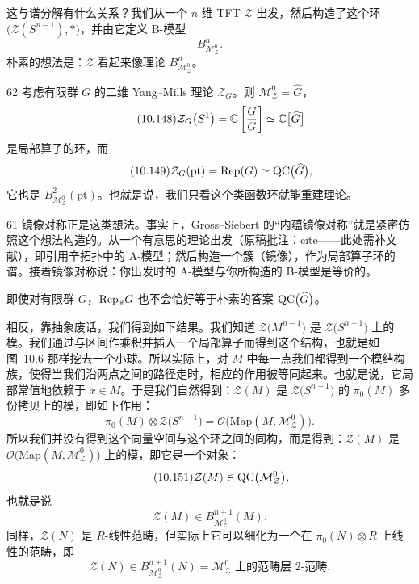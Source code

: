 这与谱分解有什么关系？我们从一个 $n$ 维 TFT $\mathcal{Z}$ 出发，然后构造了这个环 $\big(\mathcal{Z}(S^{n-1}),*\big)$，并由它定义 B-模型
\begin{equation}\tag{10.147}
B_{\mathcal{M}_{\mathcal{Z}}^{0}}^{n}.
\end{equation}
朴素的想法是：$\mathcal{Z}$ 看起来像理论 $B_{\mathcal{M}_{\mathcal{Z}}^{0}}^{n}$。

\begin{srcex}{62}
考虑有限群 $G$ 的二维 Yang--Mills 理论 $\mathcal{Z}_G$。则 $\mathcal{M}_{\mathcal{Z}}^{0}=\widehat{G}$，
\begin{equation}\tag{10.148}
\mathcal{Z}_G\big(S^1\big)=\mathbb{C}\left[\frac{G}{G}\right]\simeq\mathbb{C}\big[\widehat{G}\big]
\end{equation}
是局部算子的环，而
\begin{equation}\tag{10.149}
\mathcal{Z}_G(\mathrm{pt})=\mathrm{Rep}(G)\simeq\mathrm{QC}\big(\widehat{G}\big),
\end{equation}
它也是 $B_{\mathcal{M}_{\mathcal{Z}}^{0}}^{2}(\mathrm{pt})$。也就是说，我们只看这个类函数环就能重建理论。
\end{srcex}

\begin{srcrem}{61}
镜像对称正是这类想法。事实上，Gross--Siebert 的“内蕴镜像对称”就是紧密仿照这个想法构造的。从一个有意思的理论出发（原稿批注：cite——此处需补文献），即引用辛拓扑中的 A-模型；然后构造一个簇（镜像），作为局部算子环的谱。接着镜像对称说：你出发时的 A-模型与你所构造的 B-模型是等价的。
\end{srcrem}

即使对有限群 $G$，$\mathrm{Rep}_{\mathbb{R}}G$ 也不会恰好等于朴素的答案 $\mathrm{QC}\big(\widehat{G}\big)$。

相反，靠抽象废话，我们得到如下结果。我们知道 $\mathcal{Z}\big(M^{n-1}\big)$ 是 $\mathcal{Z}\big(S^{n-1}\big)$ 上的模。我们通过与区间作乘积并插入一个局部算子而得到这个结构，也就是如图~10.6 那样挖去一个小球。所以实际上，对 $M$ 中每一点我们都得到一个模结构族，使得当我们沿两点之间的路径走时，相应的作用被等同起来。也就是说，它局部常值地依赖于 $x\in M$。于是我们自然得到：$\mathcal{Z}(M)$ 是 $\mathcal{Z}\big(S^{n-1}\big)$ 的 $\pi_0(M)$ 多份拷贝上的模，即如下作用：
\begin{equation}\tag{10.150}
\pi_0(M)\otimes\mathcal{Z}\big(S^{n-1}\big)=\mathcal{O}\big(\mathrm{Map}(M,\mathcal{M}_{\mathcal{Z}}^{0})\big).
\end{equation}
所以我们并没有得到这个向量空间与这个环之间的同构，而是得到：$\mathcal{Z}(M)$ 是 $\mathcal{O}\big(\mathrm{Map}(M,\mathcal{M}_{\mathcal{Z}}^{0})\big)$ 上的模，即它是一个对象：
\begin{equation}\tag{10.151}
\mathcal{Z}(M)\in \mathrm{QC}\big(\mathcal{M}_{\mathcal{Z}}^{0}\big),
\end{equation}
也就是说
\begin{equation}\tag{10.152}
\mathcal{Z}(M)\in B_{\mathcal{M}_{\mathcal{Z}}^{0}}^{n+1}(M).
\end{equation}
同样，$\mathcal{Z}(N)$ 是 $R$-线性范畴，但实际上它可以细化为一个在 $\pi_0(N)\otimes R$ 上线性的范畴，即
\begin{equation}\tag{10.153}
\mathcal{Z}(N)\in B_{\mathcal{M}_{\mathcal{Z}}^{0}}^{n+1}(N)=\text{$\mathcal{M}_{\mathcal{Z}}^{0}$ 上的范畴层 $2$-范畴}.
\end{equation}

